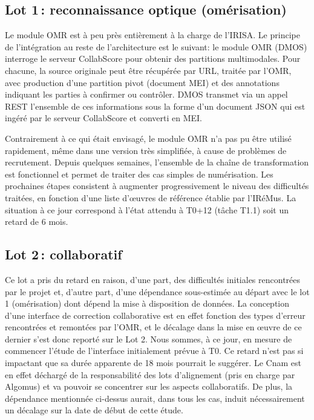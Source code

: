 \documentclass[11pt]{article}
\begin{document}
\subsection{Lot 1\,: reconnaissance optique (omérisation)}

Le module OMR est à peu près entièrement à la charge de l'IRISA. Le principe de l'intégration au reste de 
l'architecture est le suivant: le module OMR (DMOS) interroge le serveur CollabScore pour obtenir des partitions multimodales.
Pour chacune, la source originale peut être récupérée par URL, traitée par l'OMR, avec production d'une partition
pivot (document MEI) et des annotations indiquant les parties à confirmer ou contrôler. 
DMOS transmet via un appel REST l'ensemble de ces informations sous la forme d'un document JSON 
qui est ingéré par le serveur CollabScore et converti en MEI.

Contrairement à ce qui était envisagé, le module OMR n'a pas pu être utilisé
rapidement, même dans une version très simplifiée,  à cause de problèmes de recrutement. 
Depuis quelques semaines, 
l'ensemble de la chaîne de transformation est  fonctionnel et permet de traiter
des cas simples de numérisation. Les prochaines étapes consistent à augmenter progressivement le
niveau des difficultés traitées, en fonction d'une liste d'œuvres de référence établie par l'IRéMus.
La situation à ce jour correspond à l'état attendu à T0+12 (tâche T1.1) 
soit un retard de 6 mois.

\subsection{Lot 2\,: collaboratif}

Ce lot a pris du retard en raison, d'une part, des difficultés initiales rencontrées par le projet 
et, d'autre part, d'une dépendance 
sous-estimée au départ avec le lot 1 (omérisation) dont dépend la mise à disposition de données.
La conception d'une interface de correction collaborative est
en effet fonction des types d'erreur rencontrées et remontées par l'OMR, et le décalage dans la
mise en œuvre de ce dernier s'est donc reporté sur le Lot 2. Nous 
sommes, à ce jour, en mesure de commencer l'étude de l'interface initialement prévue à T0.
Ce retard n'est pas si impactant que sa durée apparente de 18 mois pourrait le suggérer. 
Le Cnam est en effet déchargé de la responsabilité des lots d'alignement (pris en charge par Algomus)
et va pouvoir se concentrer sur les aspects collaboratifs. De plus, la dépendance mentionnée ci-dessus
aurait, dans tous les cas, induit nécessairement un décalage sur la date de début de cette étude.
\end{document}
